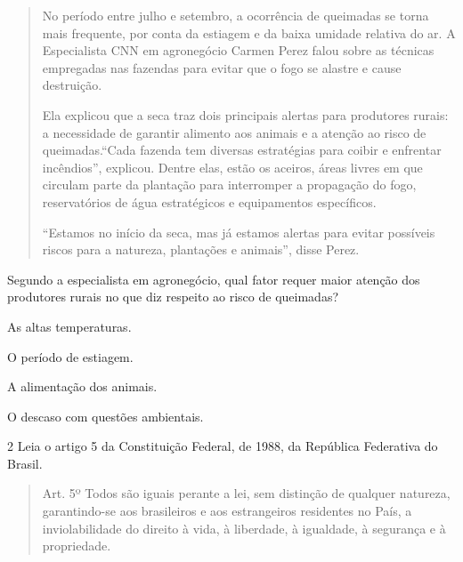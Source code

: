\begin{quote}

No período entre julho e setembro, a ocorrência de queimadas se torna
mais frequente, por conta da estiagem e da baixa umidade relativa do ar.
A Especialista CNN em agronegócio Carmen Perez falou sobre as técnicas
empregadas nas fazendas para evitar que o fogo se alastre e cause
destruição.

Ela explicou que a seca traz dois principais alertas para produtores
rurais: a necessidade de garantir alimento aos animais e a atenção ao
risco de queimadas.``Cada fazenda tem diversas estratégias para coibir e
enfrentar incêndios'', explicou. Dentre elas, estão os aceiros, áreas
livres em que circulam parte da plantação para interromper a propagação do
fogo, reservatórios de água estratégicos e equipamentos específicos.

``Estamos no início da seca, mas já estamos alertas para evitar
possíveis riscos para a natureza, plantações e animais'', disse Perez.

\end{quote}


Segundo a especialista em agronegócio, qual fator requer maior atenção
dos produtores rurais no que diz respeito ao risco de queimadas?

\begin{escolha}
    
    \item As altas temperaturas.
    
    \item O período de estiagem.
    
    \item A alimentação dos animais.
    
    \item O descaso com questões ambientais.

\end{escolha}
  
\num{2} Leia o artigo 5 da Constituição Federal, de 1988, da República
Federativa do Brasil.

\begin{quote}

Art. 5º Todos são iguais perante a lei, sem distinção de qualquer
natureza, garantindo-se aos brasileiros e aos estrangeiros residentes no
País, a inviolabilidade do direito à vida, à liberdade, à igualdade, à
segurança e à propriedade.

\end{quote}

